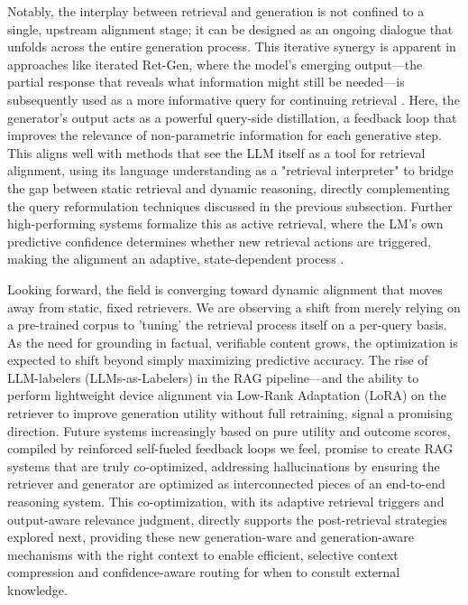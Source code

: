 \documentclass[11pt,a4paper]{article}
\begin{document}
Notably, the interplay between retrieval and generation is not confined to a single, upstream alignment stage; it can be designed as an ongoing dialogue that unfolds across the entire generation process. This iterative synergy is apparent in approaches like iterated Ret-Gen, where the model's emerging output---the partial response that reveals what information might still be needed---is subsequently used as a more informative query for continuing retrieval \cite{arxiv:2305.15294v2}. Here, the generator's output acts as a powerful query-side distillation, a feedback loop that improves the relevance of non-parametric information for each generative step. This aligns well with methods that see the LLM itself as a tool for retrieval alignment, using its language understanding as a "retrieval interpreter" to bridge the gap between static retrieval and dynamic reasoning, directly complementing the query reformulation techniques discussed in the previous subsection. Further high-performing systems formalize this as active retrieval, where the LM's own predictive confidence determines whether new retrieval actions are triggered, making the alignment an adaptive, state-dependent process \cite{arxiv:2305.06983v2}.

Looking forward, the field is converging toward dynamic alignment that moves away from static, fixed retrievers. We are observing a shift from merely relying on a pre-trained corpus to 'tuning' the retrieval process itself on a per-query basis. As the need for grounding in factual, verifiable content grows, the optimization is expected to shift beyond simply maximizing predictive accuracy. The rise of LLM-labelers (LLMs-as-Labelers) in the RAG pipeline---and the ability to perform lightweight device alignment via Low-Rank Adaptation (LoRA) on the retriever to improve generation utility without full retraining, signal a promising direction. Future systems increasingly based on pure utility and outcome scores, compiled by reinforced self-fueled feedback loops we feel, promise to create RAG systems that are truly co-optimized, addressing hallucinations by ensuring the retriever and generator are optimized as interconnected pieces of an end-to-end reasoning system. This co-optimization, with its adaptive retrieval triggers and output-aware relevance judgment, directly supports the post-retrieval strategies explored next, providing these new generation-ware and generation-aware mechanisms with the right context to enable efficient, selective context compression and confidence-aware routing for when to consult external knowledge.
\end{document}
